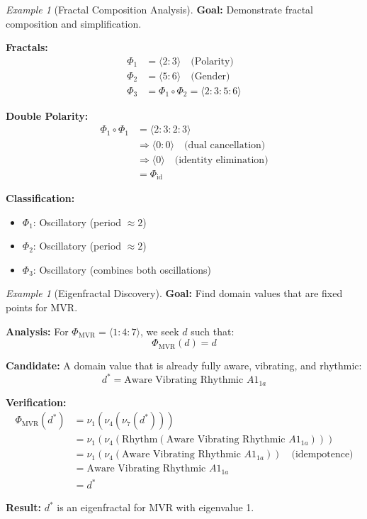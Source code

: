 \documentclass[11pt,twoside,openright]{book}
\theoremstyle{definition}
\theoremstyle{plain}
\theoremstyle{remark}
\newtheorem{example}[definition]{Example}
\newcommand{\noe}[1]{\nu_{#1}}
\newcommand{\Frac}{\Phi}
\newcommand{\id}{\mathrm{id}}
\begin{document}
\begin{example}[Fractal Composition Analysis]
\label{ex:fractal-composition}
\textbf{Goal:} Demonstrate fractal composition and simplification.

\textbf{Fractals:}
\begin{align}
\Frac_1 &= \langle 2 : 3 \rangle \quad \text{(Polarity)} \\
\Frac_2 &= \langle 5 : 6 \rangle \quad \text{(Gender)} \\
\Frac_3 &= \Frac_1 \circ \Frac_2 = \langle 2 : 3 : 5 : 6 \rangle
\end{align}

\textbf{Double Polarity:}
\begin{align}
\Frac_1 \circ \Frac_1 &= \langle 2 : 3 : 2 : 3 \rangle \\
&\Rightarrow \langle 0 : 0 \rangle \quad \text{(dual cancellation)} \\
&\Rightarrow \langle 0 \rangle \quad \text{(identity elimination)} \\
&= \Frac_{\id}
\end{align}

\textbf{Classification:}
\begin{itemize}
\item $\Frac_1$: Oscillatory (period $\approx 2$)
\item $\Frac_2$: Oscillatory (period $\approx 2$)
\item $\Frac_3$: Oscillatory (combines both oscillations)
\end{itemize}
\end{example}

\begin{example}[Eigenfractal Discovery]
\label{ex:eigenfractal}
\textbf{Goal:} Find domain values that are fixed points for MVR.

\textbf{Analysis:} For $\Frac_{\text{MVR}} = \langle 1:4:7 \rangle$, we seek $d$ such that:
\[
\Frac_{\text{MVR}}(d) = d
\]

\textbf{Candidate:} A domain value that is already fully aware, vibrating, and rhythmic:
\[
d^* = \text{Aware Vibrating Rhythmic } A1_{1a}
\]

\textbf{Verification:}
\begin{align}
\Frac_{\text{MVR}}(d^*) &= \noe{1}(\noe{4}(\noe{7}(d^*))) \\
&= \noe{1}(\noe{4}(\text{Rhythm}(\text{Aware Vibrating Rhythmic } A1_{1a}))) \\
&= \noe{1}(\noe{4}(\text{Aware Vibrating Rhythmic } A1_{1a})) \quad \text{(idempotence)} \\
&= \text{Aware Vibrating Rhythmic } A1_{1a} \\
&= d^*
\end{align}

\textbf{Result:} $d^*$ is an eigenfractal for MVR with eigenvalue 1.
\end{example}
\end{document}
